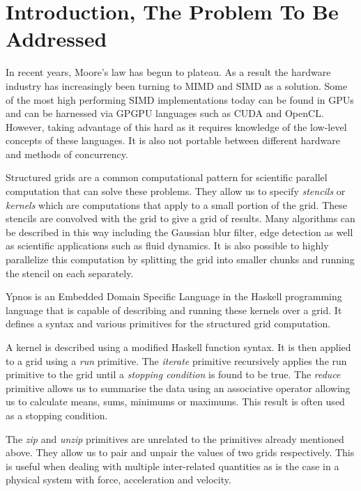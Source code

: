 



\section*{Introduction, The Problem To Be Addressed}

In recent years, Moore's law has begun to plateau. As a result the hardware 
industry has increasingly been turning to MIMD and SIMD as a solution. Some of 
the most high performing SIMD implementations today can be found in GPUs and 
can be harnessed via GPGPU languages such as CUDA and OpenCL. However, taking 
advantage of this hard as it requires knowledge of the low-level concepts of 
these languages. It is also not portable between different hardware and methods 
of concurrency.

Structured grids are a common computational pattern for scientific parallel 
computation that can solve these problems. They allow us to specify 
\emph{stencils} or \emph{kernels} which are computations that apply to a small 
portion of the grid. These stencils are convolved with the grid to give a grid 
of results. Many algorithms can be described in this way including the Gaussian 
blur filter, edge detection as well as scientific applications such as fluid 
dynamics. It is also possible to highly parallelize this computation by 
splitting the grid into smaller chunks and running the stencil on each 
separately.

Ypnos is an Embedded Domain Specific Language in the Haskell programming 
language that is capable of describing and running these kernels over a grid.  
It defines a syntax and various primitives for the structured grid computation.  

A kernel is described using a modified Haskell function syntax. It is then 
applied to a grid using a \emph{run} primitive. The \emph{iterate} primitive 
recursively applies the run primitive to the grid until a \emph{stopping 
condition} is found to be true. The \emph{reduce} primitive allows us to 
summarise the data using an associative operator allowing us to calculate 
means, sums, minimums or maximums. This result is often used as a stopping 
condition.

The \emph{zip} and \emph{unzip} primitives are unrelated to the primitives 
already mentioned above. They allow us to pair and unpair the values of two 
grids respectively. This is useful when dealing with multiple inter-related 
quantities as is the case in a physical system with force, acceleration and 
velocity.

